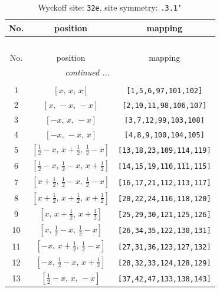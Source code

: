 \documentclass[fleqn,8pt]{jsarticle}
\begin{document}
\begin{longtable}{ccc}
\caption{Wyckoff site: {\tt 32e}, site symmetry: {\tt .3.1'}}
 \\
 \hline \hline
No. & position & mapping \\ \hline \endfirsthead

\multicolumn{2}{l}{\tablename\ \thetable{}} \\
 \hline \hline
No. & position & mapping \\ \hline \endhead

 \hline \hline
\multicolumn{2}{r}{\footnotesize\it continued ...} \\ \endfoot

 \hline \hline
\multicolumn{2}{r}{} \\ \endlastfoot

1 & $\left[ x,\, x,\, x \right]$ & {\tt [1,5,6,97,101,102]} \\ \hline
2 & $\left[ x,\, - x,\, - x \right]$ & {\tt [2,10,11,98,106,107]} \\ \hline
3 & $\left[ - x,\, x,\, - x \right]$ & {\tt [3,7,12,99,103,108]} \\ \hline
4 & $\left[ - x,\, - x,\, x \right]$ & {\tt [4,8,9,100,104,105]} \\ \hline
5 & $\left[ \frac{1}{2} - x,\, x + \frac{1}{2},\, \frac{1}{2} - x \right]$ & {\tt [13,18,23,109,114,119]} \\ \hline
6 & $\left[ \frac{1}{2} - x,\, \frac{1}{2} - x,\, x + \frac{1}{2} \right]$ & {\tt [14,15,19,110,111,115]} \\ \hline
7 & $\left[ x + \frac{1}{2},\, \frac{1}{2} - x,\, \frac{1}{2} - x \right]$ & {\tt [16,17,21,112,113,117]} \\ \hline
8 & $\left[ x + \frac{1}{2},\, x + \frac{1}{2},\, x + \frac{1}{2} \right]$ & {\tt [20,22,24,116,118,120]} \\ \hline
9 & $\left[ x,\, x + \frac{1}{2},\, x + \frac{1}{2} \right]$ & {\tt [25,29,30,121,125,126]} \\ \hline
10 & $\left[ x,\, \frac{1}{2} - x,\, \frac{1}{2} - x \right]$ & {\tt [26,34,35,122,130,131]} \\ \hline
11 & $\left[ - x,\, x + \frac{1}{2},\, \frac{1}{2} - x \right]$ & {\tt [27,31,36,123,127,132]} \\ \hline
12 & $\left[ - x,\, \frac{1}{2} - x,\, x + \frac{1}{2} \right]$ & {\tt [28,32,33,124,128,129]} \\ \hline
13 & $\left[ \frac{1}{2} - x,\, x,\, - x \right]$ & {\tt [37,42,47,133,138,143]} \\ \hline

\end{longtable}
\end{document}
